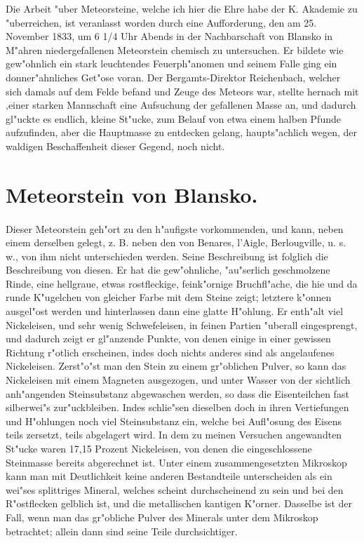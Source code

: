 \documentclass[a4paper, 11pt, oneside]{article}
\begin{document}
Die Arbeit "uber Meteorsteine, welche ich hier die Ehre habe der K. Akademie zu "uberreichen, ist veranlasst worden durch eine Aufforderung, den am 25. November 1833, um 6 1/4 Uhr Abends in der Nachbarschaft von Blansko in M"ahren niedergefallenen Meteorstein chemisch zu untersuchen. Er bildete wie gew"ohnlich ein stark leuchtendes Feuerph"anomen und seinem Falle ging ein donner"ahnliches Get"ose voran. Der Bergamts-Direktor Reichenbach, welcher sich damals auf dem Felde befand und Zeuge des Meteors war, stellte hernach mit ‚einer starken Mannschaft eine Aufsuchung der gefallenen Masse an, und dadurch gl"uckte es endlich, kleine St"ucke, zum Belauf von etwa einem halben Pfunde aufzufinden, aber die Hauptmasse zu entdecken gelang, haupts"achlich wegen, der waldigen Beschaffenheit dieser Gegend, noch nicht.

\section{Meteorstein von Blansko.}
\paragraph{}
Dieser Meteorstein geh"ort zu den h"aufigste vorkommenden, und kann, neben einem derselben gelegt, z. B. neben den von Benares, l’Aigle, Berlougville, u. s. w., von ihm nicht unterschieden werden. Seine Beschreibung ist folglich die Beschreibung von diesen. Er hat die gew"ohnliche, "au"serlich geschmolzene Rinde, eine hellgraue, etwas rostfleckige, feink"ornige Bruchfl"ache, die hie und da runde K"ugelchen von gleicher Farbe mit dem Steine zeigt; letztere k"onnen ausgel"ost werden und hinterlassen dann eine glatte H"ohlung. Er enth"alt viel Nickeleisen, und sehr wenig Schwefeleisen, in feinen Partien "uberall eingesprengt, und dadurch zeigt er gl"anzende Punkte, von denen einige in einer gewissen Richtung r"otlich erscheinen, indes doch nichts anderes sind als angelaufenes Nickeleisen. Zerst"o"st man den Stein zu einem gr"oblichen Pulver, so kann das Nickeleisen mit einem Magneten ausgezogen, und unter Wasser von der sichtlich anh"angenden Steinsubstanz abgewaschen werden, so dass die Eisenteilchen fast silberwei"s zur"uckbleiben. Indes schlie"sen dieselben doch in ihren Vertiefungen und H"ohlungen noch viel Steinsubstanz ein, welche bei Aufl"osung des Eisens teils zersetzt, teils abgelagert wird. In dem zu meinen Versuchen angewandten St"ucke waren 17,15 Prozent Nickeleisen, von denen die eingeschlossene Steinmasse bereits abgerechnet ist. Unter einem zusammengesetzten Mikroskop kann man mit Deutlichkeit keine anderen Bestandteile unterscheiden als ein wei"ses splittriges Mineral, welches scheint durchscheinend zu sein und bei den R"ostflecken gelblich ist, und die metallischen kantigen K"orner. Dasselbe ist der Fall, wenn man das gr"obliche Pulver des Minerals unter dem Mikroskop betrachtet; allein dann sind seine Teile durchsichtiger.
\end{document}
